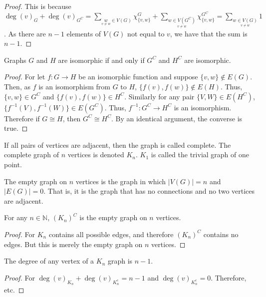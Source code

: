         \begin{proof}
        This is because $\deg(v)_G+\deg(v)_{G^C} = \sum_{\underset{v\ne w}w\in V(G)}\chi_{\{v,w\}}^G + \sum_{\underset{v\ne w}{w\in V(G^C)}}\chi_{\{v,w\}}^{G^C} = \sum_{\underset{v\ne w}{w\in V(G)}} 1$. As there are $n-1$ elements of $V(G)$ not equal to $v$, we have that the sum is $n-1$.
        \end{proof}
        \begin{theorem}
        Graphs $G$ and $H$ are isomorphic if and only if $G^C$ and $H^C$ are isomorphic.
        \end{theorem}
        \begin{proof}
        For let $f:G\rightarrow H$ be an isomorphic function and suppose $\{v,w\}\notin E(G)$. Then, as $f$ is an isomorphism from $G$ to $H$, $\{f(v),f(w)\}\notin E(H)$. Thus, $\{v,w\}\in G^C$ and $\{f(v),f(w)\}\in H^C$. Similarly for any pair $\{V,W\}\in E(H^C)$, $\{f^{-1}(V),f^{-1}(W)\} \in E(G^C)$. Thus, $f^{-1}:G^C \rightarrow H^C$ is an isomorphism. Therefore if $G\cong H$, then $G^C \cong H^C$. By an identical argument, the converse is true.
        \end{proof}
        \begin{definition}
        If all pairs of vertices are adjacent, then the graph is called complete. The complete graph of $n$ vertices is denoted $K_n$. $K_1$ is called the trivial graph of one point.
        \end{definition}
        \begin{definition}
        The empty graph on $n$ vertices is the graph in which $|V(G)| = n$ and $|E(G)| = 0$. That is, it is the graph that has no connections and no two vertices are adjacent.
        \end{definition}
        \begin{theorem}
        For any $n\in \mathbb{N}$, $(K_n)^C$ is the empty graph on $n$ vertices.
        \end{theorem}
        \begin{proof}
        For $K_n$ contains all possible edges, and therefore $(K_n)^C$ contains no edges. But this is merely the empty graph on $n$ vertices.
        \end{proof}
        \begin{theorem}
        The degree of any vertex of a $K_n$ graph is $n-1$.
        \end{theorem}
        \begin{proof}
        For $\deg(v)_{K_n} + \deg(v)_{K_n^c}=n-1$ and $\deg(v)_{K_n^c} = 0$. Therefore, etc.
        \end{proof}

